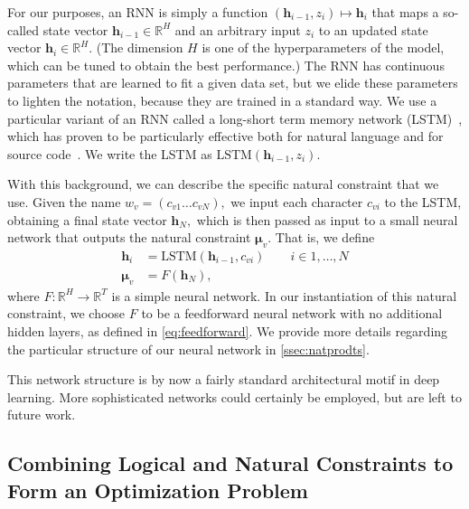 \documentclass[sigplan,10pt,anonymous]{acmart} %
\theoremstyle{plain}
\theoremstyle{remark}
\theoremstyle{definition}
\begin{document}
For our purposes, an RNN is simply a function $(\bm{h}_{i-1}, z_i) \mapsto \bm{h}_{i}$
that maps a so-called state vector $\bm{h}_{i-1} \in \mathbb{R}^H$
and an arbitrary input $z_i$ to an updated state vector $\bm{h}_{i}  \in \mathbb{R}^H$.
(The dimension $H$ is one of the hyperparameters of the model, which can be tuned
to obtain the best performance.)
The RNN has continuous parameters that are learned to fit a given data set,
but we elide these parameters to lighten the notation, because they are trained in a standard way.
We use a particular variant of an RNN called a
long-short term memory network (LSTM)~\cite{hochreiter97},
which has proven to be particularly effective both for natural language
and for source code~\cite{sundermeyer2012,melis17,white2015,dam16}. We write the LSTM as
$\text{LSTM}(\bm{h}_{i-1}, z_i)$.

With this background, we can describe the specific natural constraint that we use.
Given the name $w_v = (c_{v1} \ldots c_{vN}),$ we input each character $c_{vi}$ to the LSTM,
obtaining a final state vector $\bm{h}_N,$ which is then passed as input to a small
neural network that outputs the natural constraint $\bm{\mu}_v$.
That is, we define
\begin{subequations}\label{eq:lstm}
  \begin{align}
    \bm{h}_i   & = \text{LSTM}(\bm{h}_{i-1}, c_{vi}) \qquad i \in 1, \ldots, N \\
    \bm{\mu}_v & = F(\bm{h}_N), \label{eq:lstmb}
  \end{align}
\end{subequations}
where $F: \mathbb{R}^H \rightarrow \mathbb{R}^T$ is a simple neural network.
In our instantiation of this natural constraint, we choose $F$ to be a feedforward neural network with
no additional hidden layers, as defined in \eqref{eq:feedforward}.
We provide more details regarding the particular structure of our neural network in \cref{ssec:natprodts}.

This network structure
is by now a fairly standard architectural motif in deep learning. More sophisticated networks could certainly
be employed, but are left to future work.

\subsection{Combining Logical and Natural Constraints to Form an Optimization
  Problem} \label{ssec:optimisation}
\end{document}

